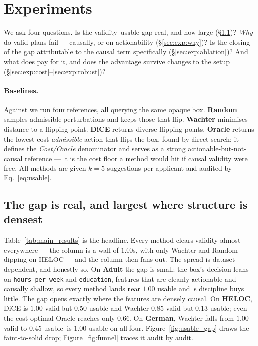 \section{Experiments}
\label{sec:experiments}

We ask four questions. Is the validity--usable gap real, and how large
(\S\ref{sec:exp:gap})? \emph{Why} do valid plans fail --- causally, or on
actionability (\S\ref{sec:exp:why})? Is the closing of the gap attributable to the
causal term specifically (\S\ref{sec:exp:ablation})? And what does \cac{} pay for
it, and does the advantage survive changes to the setup
(\S\ref{sec:exp:cost}--\ref{sec:exp:robust})?

\paragraph{Baselines.} Against \cac{} we run four references, all querying the same
opaque box. \textbf{Random} samples admissible perturbations and keeps those that
flip. \textbf{Wachter} \citep{wachter2017counterfactual} minimises distance to a
flipping point. \textbf{DiCE} \citep{mothilal2020dice} returns diverse flipping
points. \textbf{Oracle} returns the lowest-cost \emph{admissible} action that
flips the box, found by direct search; it defines the \emph{Cost/Oracle}
denominator and serves as a strong actionable-but-not-causal reference --- it is
the cost floor a method would hit if causal validity were free. All methods are
given $k=5$ suggestions per applicant and audited by
Eq.~\eqref{eq:usable}.

\subsection{The gap is real, and largest where structure is densest}
\label{sec:exp:gap}
Table~\ref{tab:main_results} is the headline. Every method clears validity almost
everywhere --- the column is a wall of $1.00$s, with only Wachter and Random
dipping on HELOC --- and the \Usable{} column then fans out. The spread is
dataset-dependent, and honestly so. On \textbf{Adult} the gap is small: the box's
decision leans on \texttt{hours\_per\_week} and \texttt{education}, features that
are cleanly actionable and causally shallow, so every method lands near
$1.00$ usable and \cac{}'s discipline buys little. The gap opens exactly where the
features are densely causal. On \textbf{HELOC}, DiCE is $1.00$ valid but $0.50$
usable and Wachter $0.85$ valid but $0.13$ usable; even the cost-optimal Oracle
reaches only $0.66$. On \textbf{German}, Wachter falls from $1.00$ valid to $0.45$
usable. \cac{} is $1.00$ usable on all four. Figure~\ref{fig:usable_gap} draws the
faint-to-solid drop; Figure~\ref{fig:funnel} traces it audit by audit.

